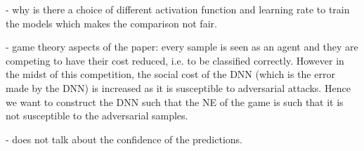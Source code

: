 \documentclass[a4paper,10pt]{article}
\theoremstyle{definition}
\begin{document}
- why is there a choice of different activation function and learning rate to train the models which makes the comparison not fair.

- game theory aspects of the paper: every sample is seen as an agent and they are competing to have their cost reduced, i.e. to be classified correctly. However in the midst of this competition, the social cost of the DNN (which is the error made by the DNN) is increased as it is susceptible to adversarial attacks. Hence we want to construct the DNN such that the NE of the game is such that it is not susceptible to the adversarial samples.

- does not talk about the confidence of the predictions.

\newpage

 

\end{document}

